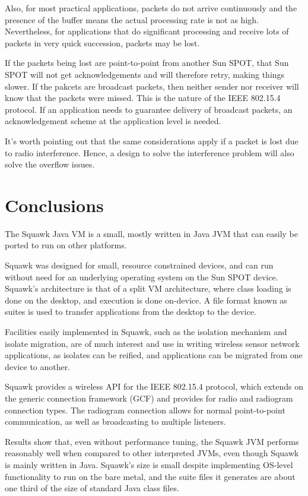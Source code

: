 \documentclass{sigplanconf}
\begin{document}
Also, for most practical applications, packets do not arrive
continuously and the presence of the buffer means the actual
processing rate is not as high. Nevertheless, for applications that do
significant processing and receive lots of packets in very quick
succession, packets may be lost.

If the packets being lost are point-to-point from another Sun SPOT,
that Sun SPOT will not get acknowledgements and will therefore
retry, making things slower.
If the pakcets are broadcast packets, then neither sender nor
receiver will know that the packets were missed.  This is the
nature of the IEEE 802.15.4 protocol.
If an application needs to guarantee delivery of broadcast
packets, an acknowledgement scheme at the application level is
needed.

It's worth pointing out that the same considerations apply if a
packet is lost due to radio interference.
Hence, a design to solve the interference problem will also
solve the overflow issues.


\section{Conclusions}
\label{sec-conclusions}

The Squawk Java VM is a small, mostly written in Java JVM 
that can easily be ported to run on other platforms.

Squawk was designed for small, resource constrained devices, 
and can run without need for an underlying operating system
on the Sun SPOT device.  
Squawk's architecture is that of a split VM architecture, 
where class loading is done on the desktop, and execution is
done on-device.  A file format known as suites is used to 
transfer applications from the desktop to the device. 
 
Facilities easily implemented in Squawk, such as the isolation
mechanism and isolate migration, are of much interest and use
in writing wireless sensor network applications, as isolates 
can be reified, and applications can be migrated from one 
device to another. 

Squawk provides a wireless API for the IEEE 802.15.4 protocol, 
which extends on the generic connection framework (GCF) and 
provides for radio and radiogram connection types.  The radiogram
connection allows for normal point-to-point communication, as 
well as broadcasting to multiple listeners.  

Results show that, even without performance tuning, the 
Squawk JVM performs reasonably well when compared to other 
interpreted JVMs, even though Squawk is mainly written in Java.  
Squawk's size is small despite implementing OS-level functionality 
to run on the bare metal, and the suite files it generates are 
about one third of the size of standard Java class files.
\end{document}
